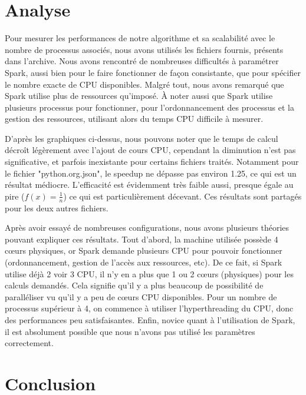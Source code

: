 \documentclass[a4paper, french]{article}
\begin{document}
\section{Analyse}

Pour mesurer les performances de notre algorithme et sa scalabilité avec le nombre de processus associés, nous avons utilisés les fichiers fournis, présents dans l'archive. Nous avons rencontré de nombreuses difficultés à paramétrer Spark, aussi bien pour le faire fonctionner de façon consistante, que pour spécifier le nombre exacte de CPU disponibles. Malgré tout, nous avons remarqué que Spark utilise plus de ressources qu'imposé. À noter aussi que Spark utilise plusieurs processus pour fonctionner, pour l'ordonnancement des processus et la gestion des ressources, utilisant alors du temps CPU difficile à mesurer.

D'après les graphiques ci-dessus, nous pouvons noter que le temps de calcul décroît légèrement avec l'ajout de cours CPU, cependant la diminution n'est pas significative, et parfois inexistante pour certains fichiers traités. Notamment pour le fichier "python.org.json", le speedup ne dépasse pas environ 1.25, ce qui est un résultat médiocre. L'efficacité est évidemment très faible aussi, presque égale au pire ($f(x) = \frac{1}{n}$) ce qui est particulièrement décevant. Ces résultats sont partagés pour les deux autres fichiers.

Après avoir essayé de nombreuses configurations, nous avons plusieurs théories pouvant expliquer ces résultats. Tout d'abord, la machine utilisée possède 4 c\oe urs physiques, or Spark demande plusieurs CPU pour pouvoir fonctionner (ordonnancement, gestion de l'accès aux ressources, etc). De ce fait, si Spark utilise déjà 2 voir 3 CPU, il n'y en a plus que 1 ou 2 c\oe urs (physiques) pour les calculs demandés. Cela signifie qu'il y a plus beaucoup de possibilité de paralléliser vu qu'il y a peu de c\oe urs CPU disponibles. Pour un nombre de processus supérieur à 4, on commence à utiliser l'hyperthreading du CPU, donc des performances peu satisfaisantes. Enfin, novice quant à l'utilisation de Spark, il est absolument possible que nous n'avons pas utilisé les paramètres correctement.

\section{Conclusion}
\end{document}
